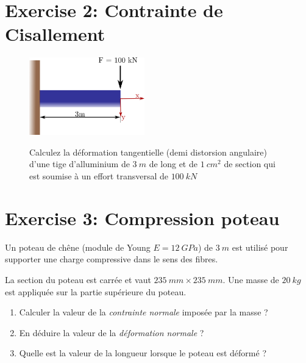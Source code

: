 \documentclass[
]{article}
\providecommand{\tightlist}{%
  \setlength{\itemsep}{0pt}\setlength{\parskip}{0pt}}\usepackage{longtable,booktabs,array}
\begin{document}
\hypertarget{exercise-2-contrainte-de-cisallement}{%
\section{Exercise 2: Contrainte de
Cisallement}\label{exercise-2-contrainte-de-cisallement}}

\begin{figure}

\begin{minipage}[c]{0.40\linewidth}

{\centering 

\includegraphics[width=5cm,height=\textheight]{../assets/img/TD1/Ex2.png}

}

\end{minipage}%
%
\begin{minipage}[c]{0.60\linewidth}

{\centering 

Calculez la déformation tangentielle (demi distorsion angulaire) d'une
tige d'alluminium de \(3~m\) de long et de \(1~cm^{2}\) de section qui
est soumise à un effort transversal de \(100~kN\)

}

\end{minipage}%

\end{figure}

\hypertarget{exercise-3-compression-poteau}{%
\section{Exercise 3: Compression
poteau}\label{exercise-3-compression-poteau}}

Un poteau de chêne (module de Young \(E= 12~GPa\)) de \(3~m\) est
utilisé pour supporter une charge compressive dans le sens des fibres.

La section du poteau est carrée et vaut \(235~mm \times 235~mm\). Une
masse de \(20~kg\) est appliquée sur la partie supérieure du poteau.

\begin{enumerate}
\def\labelenumi{\arabic{enumi}.}
\tightlist
\item
  Calculer la valeur de la \emph{contrainte normale} imposée par la
  masse ?
\item
  En déduire la valeur de la \emph{déformation normale} ?
\item
  Quelle est la valeur de la longueur lorsque le poteau est déformé ?
\end{enumerate}
\end{document}

